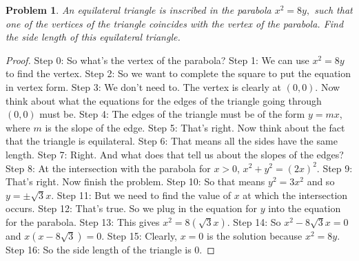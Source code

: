 \documentclass{article}
\newtheorem{theorem}{Problem}
\begin{document}
\begin{theorem}
An equilateral triangle is inscribed in the parabola $x^2 = 8y,$ such that one of the vertices of the triangle coincides with the vertex of the parabola. Find the side length of this equilateral triangle.
\end{theorem}

\begin{proof}
Step 0: So what's the vertex of the parabola?
Step 1: We can use $x^2=8y$ to find the vertex.
Step 2: So we want to complete the square to put the equation in vertex form.
Step 3: We don't need to. The vertex is clearly at $(0,0)$. Now think about what the equations for the edges of the triangle going through $(0,0)$ must be.
Step 4: The edges of the triangle must be of the form $y=mx$, where $m$ is the slope of the edge.
Step 5: That's right. Now think about the fact that the triangle is equilateral.
Step 6: That means all the sides have the same length.
Step 7: Right. And what does that tell us about the slopes of the edges?
Step 8: At the intersection with the parabola for $x>0$, $x^2+y^2=(2x)^2$.
Step 9: That's right. Now finish the problem.
Step 10: So that means $y^2=3x^2$ and so $y=\pm \sqrt{3} x$.
Step 11: But we need to find the value of $x$ at which the intersection occurs.
Step 12: That's true. So we plug in the equation for $y$ into the equation for the parabola.
Step 13: This gives $x^2=8(\sqrt{3}x)$.
Step 14: So $x^2-8\sqrt{3}x=0$ and $x(x-8\sqrt{3})=0$.
Step 15: Clearly, $x = 0$ is the solution because $x^2 = 8y$.
Step 16: So the side length of the triangle is $0$.
\end{proof}
\end{document}
